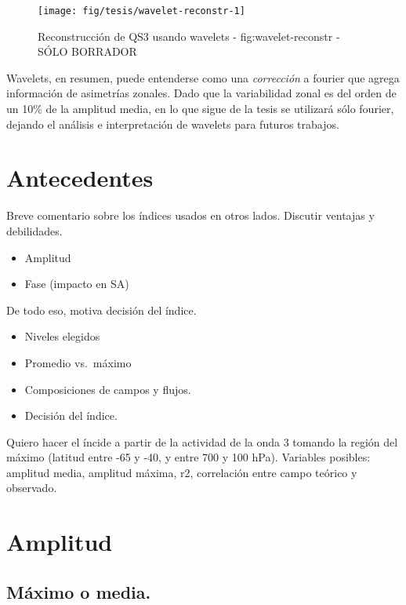 \documentclass[spanish,a4paper]{book}
\providecommand{\tightlist}{%
  \setlength{\itemsep}{0pt}\setlength{\parskip}{0pt}}
\begin{document}
\begin{figure}
\texttt{[image: fig/tesis/wavelet-reconstr-1]} \caption{Reconstrucción de QS3 usando wavelets - fig:wavelet-reconstr - SÓLO BORRADOR}\label{fig:wavelet-reconstr}
\end{figure}

Wavelets, en resumen, puede entenderse como una \emph{corrección} a
fourier que agrega información de asimetrías zonales. Dado que la
variabilidad zonal es del orden de un 10\% de la amplitud media, en lo
que sigue de la tesis se utilizará sólo fourier, dejando el análisis e
interpretación de wavelets para futuros trabajos.

\section{Antecedentes}\label{antecedentes}

Breve comentario sobre los índices usados en otros lados. Discutir
ventajas y debilidades.

\begin{itemize}
\tightlist
\item
  Amplitud
\item
  Fase (impacto en SA)
\end{itemize}

De todo eso, motiva decisión del índice.

\begin{itemize}
\tightlist
\item
  Niveles elegidos
\item
  Promedio vs.~máximo
\item
  Composiciones de campos y flujos.
\item
  Decisión del índice.
\end{itemize}

Quiero hacer el íncide a partir de la actividad de la onda 3 tomando la
región del máximo (latitud entre -65 y -40, y entre 700 y 100 hPa).
Variables posibles: amplitud media, amplitud máxima, r2, correlación
entre campo teórico y observado.

\section{Amplitud}\label{amplitud}

\subsection{Máximo o media.}\label{maximo-o-media.}
\end{document}
